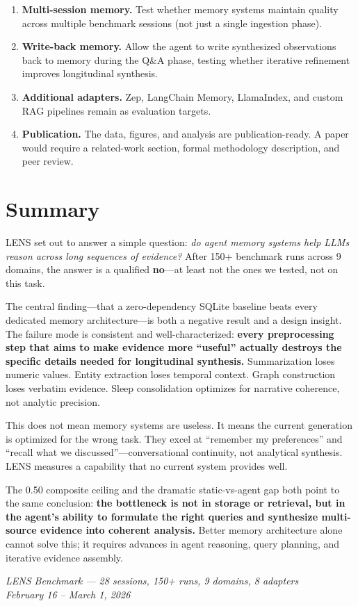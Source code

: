 \documentclass[11pt,letterpaper]{article}
\begin{document}
\begin{enumerate}[nosep]
  \item \textbf{Multi-session memory.} Test whether memory systems maintain quality across multiple benchmark sessions (not just a single ingestion phase).
  \item \textbf{Write-back memory.} Allow the agent to write synthesized observations back to memory during the Q\&A phase, testing whether iterative refinement improves longitudinal synthesis.
  \item \textbf{Additional adapters.} Zep, LangChain Memory, LlamaIndex, and custom RAG pipelines remain as evaluation targets.
  \item \textbf{Publication.} The data, figures, and analysis are publication-ready. A paper would require a related-work section, formal methodology description, and peer review.
\end{enumerate}

\section{Summary}
\label{sec:summary}

LENS set out to answer a simple question: \emph{do agent memory systems help LLMs reason across long sequences of evidence?} After 150+ benchmark runs across 9 domains, the answer is a qualified \textbf{no}---at least not the ones we tested, not on this task.

The central finding---that a zero-dependency SQLite baseline beats every dedicated memory architecture---is both a negative result and a design insight. The failure mode is consistent and well-characterized: \textbf{every preprocessing step that aims to make evidence more ``useful'' actually destroys the specific details needed for longitudinal synthesis.} Summarization loses numeric values. Entity extraction loses temporal context. Graph construction loses verbatim evidence. Sleep consolidation optimizes for narrative coherence, not analytic precision.

This does not mean memory systems are useless. It means the current generation is optimized for the wrong task. They excel at ``remember my preferences'' and ``recall what we discussed''---conversational continuity, not analytical synthesis. LENS measures a capability that no current system provides well.

The 0.50 composite ceiling and the dramatic static-vs-agent gap both point to the same conclusion: \textbf{the bottleneck is not in storage or retrieval, but in the agent's ability to formulate the right queries and synthesize multi-source evidence into coherent analysis.} Better memory architecture alone cannot solve this; it requires advances in agent reasoning, query planning, and iterative evidence assembly.

\vfill
\begin{center}
\small
\textit{LENS Benchmark --- 28 sessions, 150+ runs, 9 domains, 8 adapters}\\
\textit{February 16 -- March 1, 2026}
\end{center}
\end{document}

